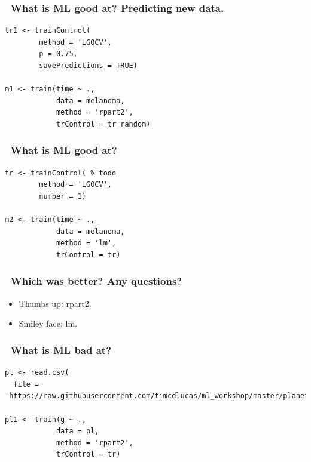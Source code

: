 \documentclass[handout, aspectratio = 169]{beamer}
\begin{document}
\begin{frame}[fragile]
\frametitle{\insertframenumber~What is ML good at? Predicting new data.}
\renewcommand{\FancyVerbFormatLine}[1]{%
   \ifnum\value{FancyVerbLine}=8\color{cyan}#1%
   \else #1\fi}
\begin{Verbatim}
tr1 <- trainControl(
        method = 'LGOCV',
        p = 0.75,
        savePredictions = TRUE)

m1 <- train(time ~ ., 
            data = melanoma,
            method = 'rpart2',
            trControl = tr_random)

\end{Verbatim}

\end{frame} 






\begin{frame}[fragile]
\frametitle{\insertframenumber~What is ML good at?}
\renewcommand{\FancyVerbFormatLine}[1]{%
   \ifnum\value{FancyVerbLine}=7\color{cyan}#1%
   \else #1\fi}
\begin{Verbatim}
tr <- trainControl( % todo
        method = 'LGOCV',
        number = 1)

m2 <- train(time ~ ., 
            data = melanoma,
            method = 'lm',
            trControl = tr)

\end{Verbatim}

\end{frame} 



\begin{frame}
\frametitle{\insertframenumber~Which was better? Any questions?}

\begin{itemize}
\item Thumbs up: rpart2.
\item Smiley face: lm.
\end{itemize}
\end{frame} 




\begin{frame}[fragile]
\frametitle{\insertframenumber~What is ML bad at?}
\renewcommand{\FancyVerbFormatLine}[1]{%
   \ifnum\value{FancyVerbLine}=1\color{cyan}#1%
   \else #1\fi}
\begin{Verbatim}
pl <- read.csv(
  file = 'https://raw.githubusercontent.com/timcdlucas/ml_workshop/master/planets.csv')

pl1 <- train(g ~ ., 
            data = pl,
            method = 'rpart2',
            trControl = tr)


\end{Verbatim}

\end{frame} 
\end{document}
